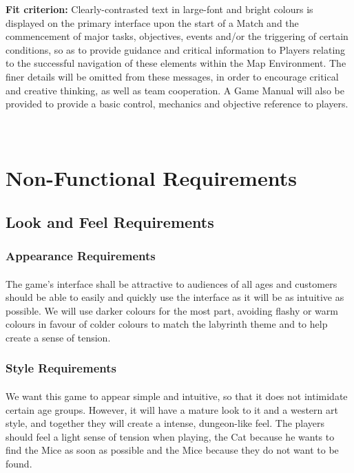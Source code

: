 \documentclass[12pt, titlepage]{article}
\begin{document}
\textbf{Fit criterion:} Clearly-contrasted text in large-font and bright colours is displayed on the primary interface upon the start of a Match and  the commencement of major tasks, objectives, events and/or  the triggering of certain conditions, so as to provide guidance and critical information to Players relating to the successful navigation of these elements within the Map Environment. The finer details will be omitted from these messages, in order to encourage critical and creative thinking, as well as team cooperation. A Game Manual will also be provided to provide a basic control, mechanics and objective reference to players. 
\\
\\
\\

\section{Non-Functional Requirements}
\subsection{Look and Feel Requirements}
\subsubsection{Appearance Requirements}
\paragraph{}The game's interface shall be attractive to audiences of all ages and customers should be able to easily and quickly use the interface as it will be as intuitive as possible. We will use darker colours for the most part, avoiding flashy or warm colours in favour of colder colours to match the labyrinth theme and to help create a sense of tension.  
\subsubsection{Style Requirements}
\paragraph{}We want this game to appear simple and intuitive, so that it does not intimidate certain age groups. However, it will have a mature look to it and a western art style, and together they will create a intense, dungeon-like feel. The players should feel a light sense of tension when playing, the Cat because he wants to find the Mice as soon as possible and the Mice because they do not want to be found.  
\end{document}
